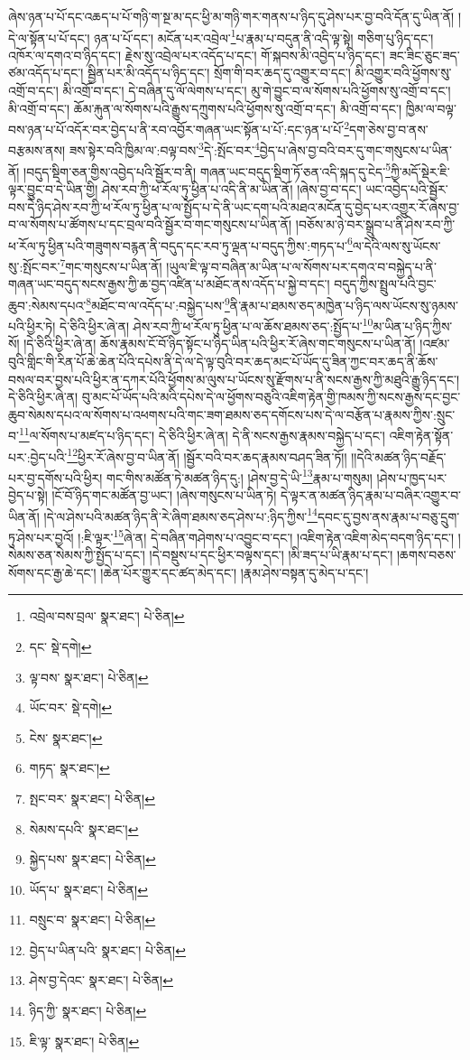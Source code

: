 ཞེས་ཉན་པ་པོ་དང་འཆད་པ་པོ་གཉི་ག་སྔ་མ་དང་ཕྱི་མ་གཉི་གར་གནས་པ་ཉིད་དུ་ཤེས་པར་བྱ་བའི་དོན་དུ་ཡིན་ནོ། །དེ་ལ་སྟོན་པ་པོ་དང་། ཉན་པ་པོ་དང་། མངོན་པར་འབྲེལ་\footnote{འབྲེལ་བས་བྲལ་  སྣར་ཐང་།  པེ་ཅིན། }པ་རྣམ་པ་བདུན་ནི་འདི་ལྟ་སྟེ། གཅིག་པུ་ཉིད་དང་། འཁོར་ལ་དགའ་བ་ཉིད་དང་། རྗེས་སུ་འབྲེལ་པར་འདོད་པ་དང་། གོ་སྐབས་མི་འབྱེད་པ་ཉིད་དང་། ཟང་ཟིང་ཅུང་ཟད་ཙམ་འདོད་པ་དང་། སྦྱིན་པར་མི་འདོད་པ་ཉིད་དང་། སྲོག་གི་བར་ཆད་དུ་འགྱུར་བ་དང་། མི་འགྱུར་བའི་ཕྱོགས་སུ་འགྲོ་བ་དང་། མི་འགྲོ་བ་དང་། དེ་བཞིན་དུ་ལོ་ལེགས་པ་དང་། མུ་གེ་བྱུང་བ་ལ་སོགས་པའི་ཕྱོགས་སུ་འགྲོ་བ་དང་། མི་འགྲོ་བ་དང་། ཆོམ་རྐུན་ལ་སོགས་པའི་རྒྱུས་དཀྲུགས་པའི་ཕྱོགས་སུ་འགྲོ་བ་དང་། མི་འགྲོ་བ་དང་། ཁྱིམ་ལ་བལྟ་བས་ཉན་པ་པོ་འདོར་བར་བྱེད་པ་ནི་རབ་འབྱོར་གཞན་ཡང་སྟོན་པ་པོ་:དང་ཉན་པ་པོ་\footnote{དང་  སྡེ་དགེ། }དག་ཅེས་བྱ་བ་ནས་བརྩམས་ནས། ཟས་སྟེར་བའི་ཁྱིམ་ལ་:བལྟ་བས་\footnote{ལྟ་བས་  སྣར་ཐང་།  པེ་ཅིན། }དེ་:སྤོང་བར་\footnote{ཡོང་བར་  སྡེ་དགེ། }བྱེད་པ་ཞེས་བྱ་བའི་བར་དུ་གང་གསུངས་པ་ཡིན་ནོ། །བདུད་སྡིག་ཅན་གྱིས་འབྱེད་པའི་སྦྱོར་བ་ནི། གཞན་ཡང་བདུད་སྡིག་ཏོ་ཅན་འདི་སྐད་དུ་ངེད་\footnote{ངེས་  སྣར་ཐང་། }ཀྱི་མདོ་སྡེར་ཇི་ལྟར་བྱུང་བ་དེ་ཡིན་གྱི། ཤེས་རབ་ཀྱི་ཕ་རོལ་ཏུ་ཕྱིན་པ་འདི་ནི་མ་ཡིན་ནོ། །ཞེས་བྱ་བ་དང་། ཡང་འབྱེད་པའི་སྦྱོར་བས་དེ་ཉིད་ཤེས་རབ་ཀྱི་ཕ་རོལ་ཏུ་ཕྱིན་པ་ལ་སྤྱོད་པ་དེ་ནི་ཡང་དག་པའི་མཐའ་མངོན་དུ་བྱེད་པར་འགྱུར་རོ་ཞེས་བྱ་བ་ལ་སོགས་པ་ཚོགས་པ་དང་བྲལ་བའི་སྦྱོར་བ་གང་གསུངས་པ་ཡིན་ནོ། །བཅོས་མ་ཉེ་བར་སྒྲུབ་པ་ནི་ཤེས་རབ་ཀྱི་ཕ་རོལ་ཏུ་ཕྱིན་པའི་གཟུགས་བརྙན་ནི་བདུད་དང་རབ་ཏུ་ལྡན་པ་བདུད་ཀྱིས་:གཏད་པ་\footnote{གཏད་  སྣར་ཐང་། }ལ་དེའི་ལས་སུ་ཡོངས་སུ་:སྤོང་བར་\footnote{སྤང་བར་  སྣར་ཐང་།  པེ་ཅིན། }གང་གསུངས་པ་ཡིན་ནོ། །ཡུལ་ཇི་ལྟ་བ་བཞིན་མ་ཡིན་པ་ལ་སོགས་པར་དགའ་བ་བསྐྱེད་པ་ནི་གཞན་ཡང་བདུད་སངས་རྒྱས་ཀྱི་ཆ་བྱད་འཛིན་པ་མཐོང་ནས་འདོད་པ་སྐྱེ་བ་དང་། བདུད་ཀྱིས་སྤྲུལ་པའི་བྱང་ཆུབ་:སེམས་དཔའ་\footnote{སེམས་དཔའི་  སྣར་ཐང་། }མཐོང་བ་ལ་འདོད་པ་:བསྐྱེད་པས་\footnote{སྐྱེད་པས་  སྣར་ཐང་།  པེ་ཅིན། }ནི་རྣམ་པ་ཐམས་ཅད་མཁྱེན་པ་ཉིད་ལས་ཡོངས་སུ་ཉམས་པའི་ཕྱིར་ཏེ། དེ་ཅིའི་ཕྱིར་ཞེ་ན། ཤེས་རབ་ཀྱི་ཕ་རོལ་ཏུ་ཕྱིན་པ་ལ་ཆོས་ཐམས་ཅད་:སྤྱོད་པ་\footnote{ཡོད་པ་  སྣར་ཐང་།  པེ་ཅིན། }མ་ཡིན་པ་ཉིད་ཀྱིས་སོ། །དེ་ཅིའི་ཕྱིར་ཞེ་ན། ཆོས་རྣམས་ངོ་བོ་ཉིད་སྟོང་པ་ཉིད་ཡིན་པའི་ཕྱིར་རོ་ཞེས་གང་གསུངས་པ་ཡིན་ནོ། །འཛམ་བུའི་གླིང་གི་རིན་པོ་ཆེ་ཆེན་པོའི་དཔེས་ནི་དེ་ལ་དེ་ལྟ་བུའི་བར་ཆད་མང་པོ་ཡོད་དུ་ཟིན་ཀྱང་བར་ཆད་ནི་ཆོས་བསལ་བར་བྱས་པའི་ཕྱིར་ན་དཀར་པོའི་ཕྱོགས་མ་ལུས་པ་ཡོངས་སུ་རྫོགས་པ་ནི་སངས་རྒྱས་ཀྱི་མཐུའི་རྒྱུ་ཉིད་དང་། དེ་ཅིའི་ཕྱིར་ཞེ་ན། བུ་མང་པོ་ཡོད་པའི་མའི་དཔེས་དེ་ལ་ཕྱོགས་བཅུའི་འཇིག་རྟེན་གྱི་ཁམས་ཀྱི་སངས་རྒྱས་དང་བྱང་ཆུབ་སེམས་དཔའ་ལ་སོགས་པ་འཕགས་པའི་གང་ཟག་ཐམས་ཅད་དགོངས་པས་དེ་ལ་བརྩོན་པ་རྣམས་ཀྱིས་:སྲུང་བ་\footnote{བསྲུང་བ་  སྣར་ཐང་།  པེ་ཅིན། }ལ་སོགས་པ་མཛད་པ་ཉིད་དང་། དེ་ཅིའི་ཕྱིར་ཞེ་ན། དེ་ནི་སངས་རྒྱས་རྣམས་བསྐྱེད་པ་དང་། འཇིག་རྟེན་སྟོན་པར་:བྱེད་པའི་\footnote{བྱེད་པ་ཡིན་པའི་  སྣར་ཐང་།  པེ་ཅིན། }ཕྱིར་རོ་ཞེས་བྱ་བ་ཡིན་ནོ། །སྦྱོར་བའི་བར་ཆད་རྣམས་བཤད་ཟིན་ཏོ།། །།དེའི་མཚན་ཉིད་བརྗོད་པར་བྱ་དགོས་པའི་ཕྱིར། གང་གིས་མཚོན་ཏེ་མཚན་ཉིད་དུ:། །ཤེས་བྱ་དེ་ཡི་\footnote{ཤེས་བྱ་དེའང་  སྣར་ཐང་།  པེ་ཅིན། }རྣམ་པ་གསུམ། །ཤེས་པ་ཁྱད་པར་བྱེད་པ་སྟེ། །ངོ་བོ་ཉིད་གང་མཚོན་བྱ་ཡང་། །ཞེས་གསུངས་པ་ཡིན་ཏེ། དེ་ལྟར་ན་མཚན་ཉིད་རྣམ་པ་བཞིར་འགྱུར་བ་ཡིན་ནོ། །དེ་ལ་ཤེས་པའི་མཚན་ཉིད་ནི་རེ་ཞིག་ཐམས་ཅད་ཤེས་པ་:ཉིད་ཀྱིས་\footnote{ཉིད་ཀྱི་  སྣར་ཐང་།  པེ་ཅིན། }དབང་དུ་བྱས་ནས་རྣམ་པ་བཅུ་དྲུག་ཏུ་ཤེས་པར་བྱའོ། །:ཇི་ལྟར་\footnote{ཇི་ལྟ་  སྣར་ཐང་།  པེ་ཅིན། }ཞེ་ན། དེ་བཞིན་གཤེགས་པ་འབྱུང་བ་དང་། །འཇིག་རྟེན་འཇིག་མེད་བདག་ཉིད་དང་། །སེམས་ཅན་སེམས་ཀྱི་སྤྱོད་པ་དང་། །དེ་བསྡུས་པ་དང་ཕྱིར་བལྟས་དང་། །མི་ཟད་པ་ཡི་རྣམ་པ་དང་། །ཆགས་བཅས་སོགས་དང་རྒྱ་ཆེ་དང་། །ཆེན་པོར་གྱུར་དང་ཚད་མེད་དང་། །རྣམ་ཤེས་བསྟན་དུ་མེད་པ་དང་། 